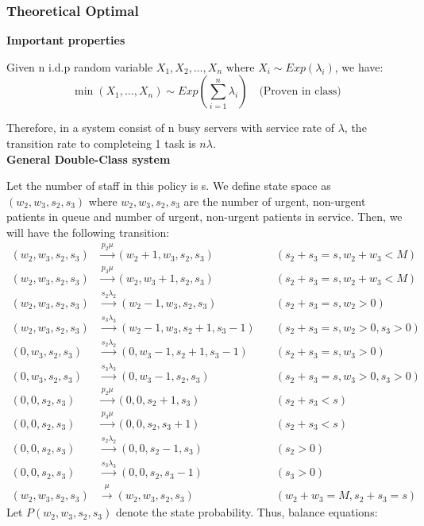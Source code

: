 \documentclass{article}
\begin{document}
\subsubsection*{Theoretical Optimal}
\textbf{Important properties}

Given n i.d.p random variable $X_1, X_2, \dots, X_n \text{ where } X_i \sim Exp(\lambda_i)$, we have:
\[\min(X_1, \dots, X_n) \sim Exp(\sum_{i=1}^{n}\lambda_i) \quad \text{(Proven in class)}\]

Therefore, in a system consist of n busy servers with service rate of $\lambda$, the transition rate to completeing 1 task is $n\lambda$.\\

\textbf{General Double-Class system}

Let the number of staff in this policy is s.
We define state space as $(w_2, w_3, s_2, s_3)$ where $w_2, w_3, s_2, s_3$ are the number of urgent, non-urgent patients in queue and number of urgent, non-urgent patients in service. Then, we will have the following transition:
\begin{align*}
    (w_2, w_3, s_2, s_3) &\xrightarrow{p_2\mu} (w_2 + 1, w_3, s_2, s_3) &\quad (s_2 + s_3 = s, w_2 + w_3 < M)\\
    (w_2, w_3, s_2, s_3) &\xrightarrow{p_3\mu} (w_2, w_3+1, s_2, s_3) &\quad (s_2 + s_3 = s, w_2 + w_3 < M)\\
    (w_2, w_3, s_2, s_3) &\xrightarrow{s_2\lambda_2} (w_2-1, w_3, s_2, s_3) &\quad (s_2 + s_3 = s, w_2 > 0)\\
    (w_2, w_3, s_2, s_3) &\xrightarrow{s_3\lambda_3} (w_2-1, w_3, s_2+1, s_3-1) &\quad (s_2 + s_3 = s, w_2 > 0, s_3 > 0)\\
    (0, w_3, s_2, s_3) &\xrightarrow{s_2\lambda_2} (0, w_3-1, s_2+1, s_3-1) &\quad (s_2 + s_3 = s, w_3 > 0)\\
    (0, w_3, s_2, s_3) &\xrightarrow{s_3\lambda_3} (0, w_3-1, s_2, s_3) &\quad (s_2 + s_3 = s, w_3 > 0, s_3 > 0)\\
    (0, 0, s_2, s_3) &\xrightarrow{p_2\mu} (0, 0, s_2 + 1, s_3) &\quad (s_2 + s_3 < s)\\
    (0, 0, s_2, s_3) &\xrightarrow{p_3\mu} (0, 0, s_2, s_3+1) &\quad (s_2 + s_3 < s)\\
    (0, 0, s_2, s_3) &\xrightarrow{s_2\lambda_2} (0, 0, s_2-1, s_3)&\quad(s_2 > 0)\\
    (0, 0, s_2, s_3) &\xrightarrow{s_3\lambda_3} (0, 0, s_2, s_3-1)&\quad(s_3 > 0)\\
    (w_2, w_3, s_2, s_3) &\xrightarrow{\mu} (w_2, w_3, s_2, s_3)&\quad(w_2 + w_3 = M, s_2 + s_3 = s)
\end{align*}
Let $P(w_2,w_3,s_2,s_3)$ denote the state probability.
Thus, balance equations:\\
\end{document}
